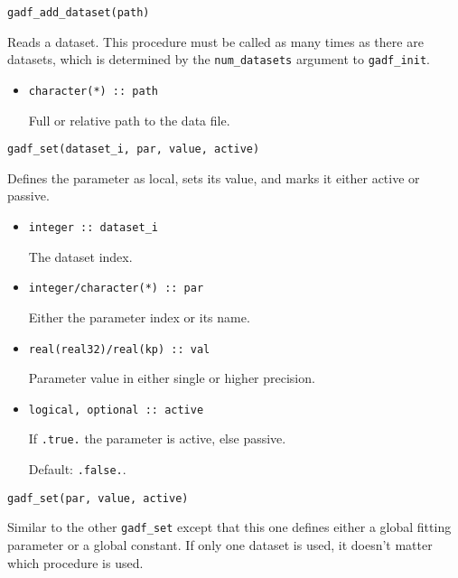 \documentclass{article}
\begin{document}
\begin{verbatim}
gadf_add_dataset(path)
\end{verbatim}
Reads a dataset. This procedure must be called as many times as there
are datasets, which is determined by the \verb+num_datasets+ argument
to \verb+gadf_init+.
\begin{itemize}
\item
\begin{verbatim}
character(*) :: path
\end{verbatim}
  Full or relative path to the data file.
\end{itemize}

\begin{verbatim}
gadf_set(dataset_i, par, value, active)
\end{verbatim}
Defines the parameter as local, sets its value, and marks it either
active or passive.
\begin{itemize}
\item 
\begin{verbatim}
integer :: dataset_i
\end{verbatim}
  The dataset index.
\item 
\begin{verbatim}
integer/character(*) :: par
\end{verbatim}
  Either the parameter index or its name.
\item 
\begin{verbatim}
real(real32)/real(kp) :: val
\end{verbatim}
  Parameter value in either single or higher precision.
\item 
\begin{verbatim}
logical, optional :: active
\end{verbatim}
  If \verb+.true.+ the parameter is active, else passive.
  
  Default: \verb+.false.+.
\end{itemize}

\begin{verbatim}
gadf_set(par, value, active)
\end{verbatim}
Similar to the other \verb+gadf_set+ except that this one defines
either a global fitting parameter or a global constant. If only one
dataset is used, it doesn't matter which procedure is used.
\end{document}
